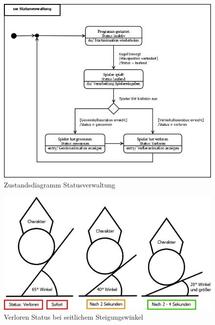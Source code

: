 \begin{figure}[H]
\centering
\caption{Zustandsdiagramm Statusverwaltung}
\label{Abb:SMStatus}
\includegraphics[scale=0.35]{Bilder/Diagramme/smStatusverwaltung.png}
\end{figure}

\begin{figure}[H]
\centering
\caption{Verloren Status bei seitlichem Steigungswinkel}
\label{Abb:SeitlWinkel}
\includegraphics[scale=0.275]{Bilder/Diagramme/VerlierWinkelSeitlich.png}
\end{figure}
